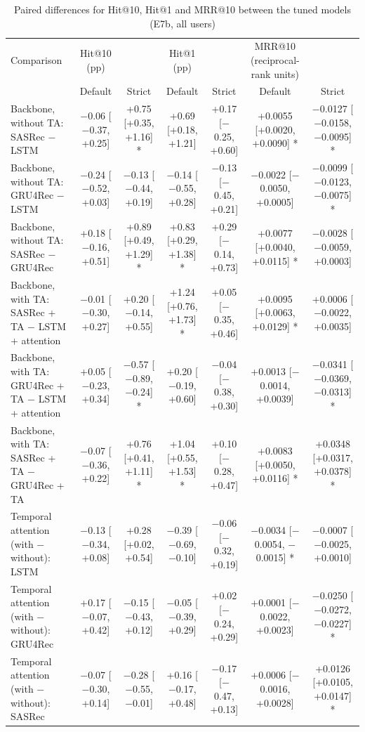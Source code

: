 \begin{table}[t]\centering\footnotesize
\caption{Paired differences for Hit@10, Hit@1 and MRR@10 between the tuned models (E7b, all users)}
\begin{tabular}{lcccccc}\toprule
Comparison & Hit@10 (pp) &  & Hit@1 (pp) &  & MRR@10 (reciprocal-rank units) &  \\
 & Default & Strict & Default & Strict & Default & Strict \\
\midrule
Backbone, without TA: SASRec $-$ LSTM & $-$0.06 [$-$0.37, +0.25] & +0.75 [+0.35, +1.16] * & +0.69 [+0.18, +1.21] & +0.17 [$-$0.25, +0.60] & +0.0055 [+0.0020, +0.0090] * & $-$0.0127 [$-$0.0158, $-$0.0095] * \\
Backbone, without TA: GRU4Rec $-$ LSTM & $-$0.24 [$-$0.52, +0.03] & $-$0.13 [$-$0.44, +0.19] & $-$0.14 [$-$0.55, +0.28] & $-$0.13 [$-$0.45, +0.21] & $-$0.0022 [$-$0.0050, +0.0005] & $-$0.0099 [$-$0.0123, $-$0.0075] * \\
Backbone, without TA: SASRec $-$ GRU4Rec & +0.18 [$-$0.16, +0.51] & +0.89 [+0.49, +1.29] * & +0.83 [+0.29, +1.38] * & +0.29 [$-$0.14, +0.73] & +0.0077 [+0.0040, +0.0115] * & $-$0.0028 [$-$0.0059, +0.0003] \\
Backbone, with TA: SASRec + TA $-$ LSTM + attention & $-$0.01 [$-$0.30, +0.27] & +0.20 [$-$0.14, +0.55] & +1.24 [+0.76, +1.73] * & +0.05 [$-$0.35, +0.46] & +0.0095 [+0.0063, +0.0129] * & +0.0006 [$-$0.0022, +0.0035] \\
Backbone, with TA: GRU4Rec + TA $-$ LSTM + attention & +0.05 [$-$0.23, +0.34] & $-$0.57 [$-$0.89, $-$0.24] * & +0.20 [$-$0.19, +0.60] & $-$0.04 [$-$0.38, +0.30] & +0.0013 [$-$0.0014, +0.0039] & $-$0.0341 [$-$0.0369, $-$0.0313] * \\
Backbone, with TA: SASRec + TA $-$ GRU4Rec + TA & $-$0.07 [$-$0.36, +0.22] & +0.76 [+0.41, +1.11] * & +1.04 [+0.55, +1.53] * & +0.10 [$-$0.28, +0.47] & +0.0083 [+0.0050, +0.0116] * & +0.0348 [+0.0317, +0.0378] * \\
Temporal attention (with $-$ without): LSTM & $-$0.13 [$-$0.34, +0.08] & +0.28 [+0.02, +0.54] & $-$0.39 [$-$0.69, $-$0.10] & $-$0.06 [$-$0.32, +0.19] & $-$0.0034 [$-$0.0054, $-$0.0015] * & $-$0.0007 [$-$0.0025, +0.0010] \\
Temporal attention (with $-$ without): GRU4Rec & +0.17 [$-$0.07, +0.42] & $-$0.15 [$-$0.43, +0.12] & $-$0.05 [$-$0.39, +0.29] & +0.02 [$-$0.24, +0.29] & +0.0001 [$-$0.0022, +0.0023] & $-$0.0250 [$-$0.0272, $-$0.0227] * \\
Temporal attention (with $-$ without): SASRec & $-$0.07 [$-$0.30, +0.14] & $-$0.28 [$-$0.55, $-$0.01] & +0.16 [$-$0.17, +0.48] & $-$0.17 [$-$0.47, +0.13] & +0.0006 [$-$0.0016, +0.0028] & +0.0126 [+0.0105, +0.0147] * \\

\end{tabular}
\end{table}
